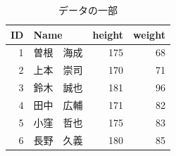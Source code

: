 \begin{table}[ht]
	\centering
	\caption{データの一部}
	\begin{tabular}{rlrr}
		ID & Name  & height & weight \\
		\hline
		1  & 曽根　海成 & 175    & 68     \\
		2  & 上本　崇司 & 170    & 71     \\
		3  & 鈴木　誠也 & 181    & 96     \\
		4  & 田中　広輔 & 171    & 82     \\
		5  & 小窪　哲也 & 175    & 83     \\
		6  & 長野　久義 & 180    & 85     \\
		\hline
	\end{tabular}
	\label{tab::04_04}
\end{table}

